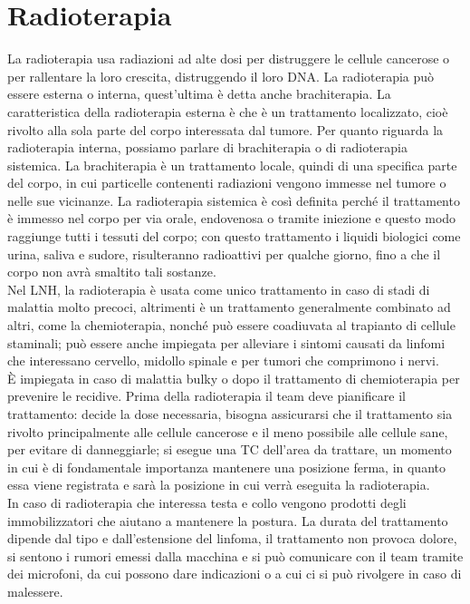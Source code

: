 \section{Radioterapia}
La radioterapia usa radiazioni ad alte dosi per distruggere le cellule cancerose o per rallentare la loro crescita, 
distruggendo il loro DNA. 
La radioterapia può essere esterna o interna, quest'ultima è detta anche brachiterapia. 
La caratteristica della radioterapia esterna è che è un trattamento localizzato, cioè rivolto alla sola parte 
del corpo interessata dal tumore. 
Per quanto riguarda la radioterapia interna, possiamo parlare di brachiterapia o di radioterapia sistemica. 
La brachiterapia è un trattamento locale, quindi di una specifica parte del corpo, in cui particelle contenenti 
radiazioni vengono immesse nel tumore o nelle sue vicinanze. 
La radioterapia sistemica è così definita perché il trattamento è immesso nel corpo per via orale, endovenosa o 
tramite iniezione e questo modo raggiunge tutti i tessuti del corpo; con questo trattamento i liquidi biologici 
come urina, saliva e sudore, risulteranno radioattivi per qualche giorno, fino a che il corpo non avrà smaltito 
tali sostanze\cite{NIH}.\\
Nel LNH, la radioterapia è usata come unico trattamento in caso di stadi di malattia molto precoci, 
altrimenti è un trattamento generalmente combinato ad altri, come la chemioterapia, nonché può essere 
coadiuvata al trapianto di cellule staminali; può essere anche impiegata per alleviare i sintomi causati da 
linfomi che interessano cervello, midollo spinale e per tumori che comprimono i nervi\cite{ACSRADIATION}.\\
È impiegata in caso di malattia bulky o dopo il trattamento di chemioterapia per prevenire le recidive. 
Prima della radioterapia il team deve pianificare il trattamento: decide la dose necessaria, bisogna assicurarsi 
che il trattamento sia rivolto principalmente alle cellule cancerose e il meno possibile alle cellule sane, 
per evitare di danneggiarle; si esegue una TC dell’area da trattare, un momento in cui è di fondamentale importanza 
mantenere una posizione ferma, in quanto essa viene registrata e sarà la posizione in cui verrà eseguita la 
radioterapia\cite{MACMILLAN}.\\
In caso di radioterapia che interessa testa e collo vengono prodotti degli immobilizzatori che aiutano a mantenere 
la postura. La durata del trattamento dipende dal tipo e dall’estensione del linfoma, il trattamento non provoca 
dolore, si sentono i rumori emessi dalla macchina e si può comunicare con il team tramite dei microfoni, da cui 
possono dare indicazioni o a cui ci si può rivolgere in caso di malessere\cite{UKRADIOTP}.\\

